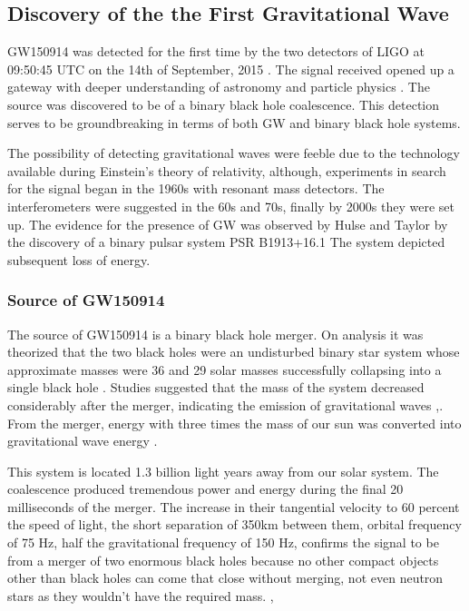 \subsection{Discovery of the the First Gravitational Wave}

\hspace{0.5cm} GW150914 was detected for the first time by the two detectors of LIGO at 09:50:45 UTC on the 14th of September, 2015 \cite{PhysRevLett.116.061102}. The signal received opened up a gateway with deeper understanding of astronomy and particle physics \cite{Abbott_2016}. The source was discovered to be of a binary black hole coalescence. This detection serves to be groundbreaking in terms of both GW and binary black hole systems.

The possibility of detecting gravitational waves were feeble due to the technology available during Einstein’s theory of relativity, although, experiments in search for the signal began in the 1960s with resonant mass detectors.  The interferometers were suggested in the 60s and 70s, finally by 2000s they were set up.   
The evidence for the presence of GW was observed by Hulse and Taylor by the discovery of a binary pulsar system PSR B1913+16.1 The system depicted subsequent loss of energy. \cite{PhysRevLett.116.061102}\\

\subsubsection{Source of GW150914}
\hspace{0.5cm} The source of GW150914 is a binary black hole merger. On analysis it was theorized that the two black holes were an undisturbed binary star system whose approximate masses were 36 and 29 solar masses successfully collapsing into a single black hole \cite{Abbott_2016} . Studies suggested that the mass of the system decreased considerably after the merger, indicating the emission of gravitational waves \cite{Ligo_org},\cite{LIGO_org}. From the merger, energy with three times the mass of our sun was converted into gravitational wave energy \cite{LIGO_org}.

This system is located 1.3 billion light years away from our solar system. The coalescence produced tremendous power and energy during the final 20 milliseconds of the merger. The increase in their tangential velocity to 60 percent the speed of light, the short separation of 350km between them, orbital frequency of 75 Hz, half the gravitational frequency of 150 Hz, confirms the signal to be from a merger of two enormous black holes because no other compact objects other than black holes can come that close without merging, not even neutron stars as they wouldn't have the required mass. \cite{PhysRevLett.116.061102},\cite{LIGO_org}\\

